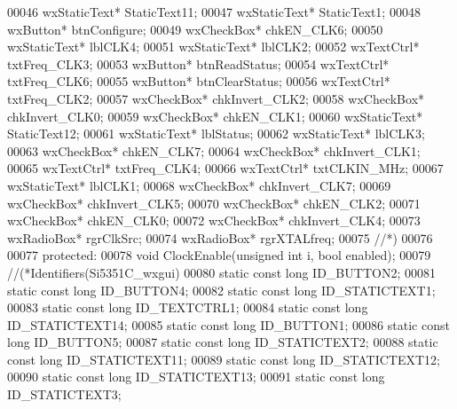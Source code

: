 \begin{DoxyCode}
00046     wxStaticText* StaticText11;
00047     wxStaticText* StaticText1;
00048     wxButton* btnConfigure;
00049     wxCheckBox* chkEN_CLK6;
00050     wxStaticText* lblCLK4;
00051     wxStaticText* lblCLK2;
00052     wxTextCtrl* txtFreq_CLK3;
00053     wxButton* btnReadStatus;
00054     wxTextCtrl* txtFreq_CLK6;
00055     wxButton* btnClearStatus;
00056     wxTextCtrl* txtFreq_CLK2;
00057     wxCheckBox* chkInvert_CLK2;
00058     wxCheckBox* chkInvert_CLK0;
00059     wxCheckBox* chkEN_CLK1;
00060     wxStaticText* StaticText12;
00061     wxStaticText* lblStatus;
00062     wxStaticText* lblCLK3;
00063     wxCheckBox* chkEN_CLK7;
00064     wxCheckBox* chkInvert_CLK1;
00065     wxTextCtrl* txtFreq_CLK4;
00066     wxTextCtrl* txtCLKIN_MHz;
00067     wxStaticText* lblCLK1;
00068     wxCheckBox* chkInvert_CLK7;
00069     wxCheckBox* chkInvert_CLK5;
00070     wxCheckBox* chkEN_CLK2;
00071     wxCheckBox* chkEN_CLK0;
00072     wxCheckBox* chkInvert_CLK4;
00073     wxRadioBox* rgrClkSrc;
00074     wxRadioBox* rgrXTALfreq;
00075     \textcolor{comment}{//*)}
00076 
00077 \textcolor{keyword}{protected}:
00078     \textcolor{keywordtype}{void} ClockEnable(\textcolor{keywordtype}{unsigned} \textcolor{keywordtype}{int} i, \textcolor{keywordtype}{bool} enabled);
00079     \textcolor{comment}{//(*Identifiers(Si5351C\_wxgui)}
00080     \textcolor{keyword}{static} \textcolor{keyword}{const} \textcolor{keywordtype}{long} ID_BUTTON2;
00081     \textcolor{keyword}{static} \textcolor{keyword}{const} \textcolor{keywordtype}{long} ID_BUTTON4;
00082     \textcolor{keyword}{static} \textcolor{keyword}{const} \textcolor{keywordtype}{long} ID_STATICTEXT1;
00083     \textcolor{keyword}{static} \textcolor{keyword}{const} \textcolor{keywordtype}{long} ID_TEXTCTRL1;
00084     \textcolor{keyword}{static} \textcolor{keyword}{const} \textcolor{keywordtype}{long} ID_STATICTEXT14;
00085     \textcolor{keyword}{static} \textcolor{keyword}{const} \textcolor{keywordtype}{long} ID_BUTTON1;
00086     \textcolor{keyword}{static} \textcolor{keyword}{const} \textcolor{keywordtype}{long} ID_BUTTON5;
00087     \textcolor{keyword}{static} \textcolor{keyword}{const} \textcolor{keywordtype}{long} ID_STATICTEXT2;
00088     \textcolor{keyword}{static} \textcolor{keyword}{const} \textcolor{keywordtype}{long} ID_STATICTEXT11;
00089     \textcolor{keyword}{static} \textcolor{keyword}{const} \textcolor{keywordtype}{long} ID_STATICTEXT12;
00090     \textcolor{keyword}{static} \textcolor{keyword}{const} \textcolor{keywordtype}{long} ID_STATICTEXT13;
00091     \textcolor{keyword}{static} \textcolor{keyword}{const} \textcolor{keywordtype}{long} ID_STATICTEXT3;

\end{DoxyCode}
